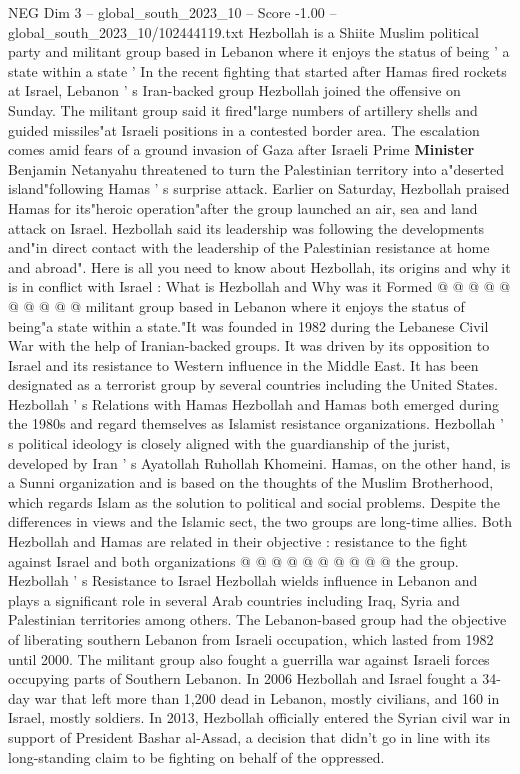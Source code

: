 \begin{textsample}{NEG Dim 3 – global\_south\_2023\_10 – Score -1.00 – global\_south\_2023\_10/102444119.txt}  \label{ex:f3_neg_029}
Hezbollah is a Shiite Muslim political party and militant group based in Lebanon where it enjoys the status of being ' a state within a state ' In the recent fighting that started after Hamas fired rockets at Israel, Lebanon ' s Iran-backed group Hezbollah joined the offensive on Sunday.
The militant group said it fired"large numbers of artillery shells and guided missiles"at Israeli positions in a contested border area.
The escalation comes amid fears of a ground invasion of Gaza after Israeli Prime \textbf{Minister} Benjamin Netanyahu threatened to turn the Palestinian territory into a"deserted island"following Hamas ' s surprise attack.
Earlier on Saturday, Hezbollah praised Hamas for its"heroic operation"after the group launched an air, sea and land attack on Israel.
Hezbollah said its leadership was following the developments and"in direct contact with the leadership of the Palestinian resistance at home and abroad".
Here is all you need to know about Hezbollah, its origins and why it is in conflict with Israel : What is Hezbollah and Why was it Formed @ @ @ @ @ @ @ @ @ @ militant group based in Lebanon where it enjoys the status of being"a state within a state."It was founded in 1982 during the Lebanese Civil War with the help of Iranian-backed groups.
It was driven by its opposition to Israel and its resistance to Western influence in the Middle East.
It has been designated as a terrorist group by several countries including the United States.
Hezbollah ' s Relations with Hamas Hezbollah and Hamas both emerged during the 1980s and regard themselves as Islamist resistance organizations.
Hezbollah ' s political ideology is closely aligned with the guardianship of the jurist, developed by Iran ' s Ayatollah Ruhollah Khomeini.
Hamas, on the other hand, is a Sunni organization and is based on the thoughts of the Muslim Brotherhood, which regards Islam as the solution to political and social problems.
Despite the differences in views and the Islamic sect, the two groups are long-time allies.
Both Hezbollah and Hamas are related in their objective : resistance to the fight against Israel and both organizations @ @ @ @ @ @ @ @ @ @ the group.
Hezbollah ' s Resistance to Israel Hezbollah wields influence in Lebanon and plays a significant role in several Arab countries including Iraq, Syria and Palestinian territories among others.
The Lebanon-based group had the objective of liberating southern Lebanon from Israeli occupation, which lasted from 1982 until 2000.
The militant group also fought a guerrilla war against Israeli forces occupying parts of Southern Lebanon.
In 2006 Hezbollah and Israel fought a 34-day war that left more than 1,200 dead in Lebanon, mostly civilians, and 160 in Israel, mostly soldiers.
In 2013, Hezbollah officially entered the Syrian civil war in support of President Bashar al-Assad, a decision that didn't go in line with its long-standing claim to be fighting on behalf of the oppressed.

\end{textsample}
